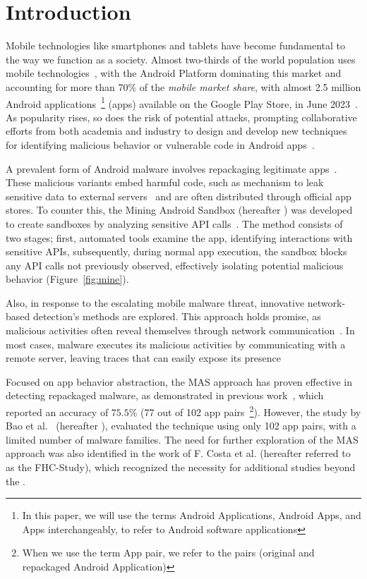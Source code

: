 \section{Introduction}\label{sec:introduction}

Mobile technologies like smartphones and tablets have become fundamental to the way we function as a society. Almost two-thirds of the world population uses mobile technologies~\cite{Comscore,DBLP:journals/tse/MartinSJZH17}, with the
Android Platform dominating this market and accounting for more than 70\% of the \emph{mobile market share}, with almost 2.5 million Android applications~\footnote{In this paper, we will use the terms Android Applications, Android Apps, and Apps interchangeably, to refer to Android software applications} (apps) available on the Google Play Store, in June 2023~\cite{Statista}.  
As popularity rises, so does the risk of potential attacks, prompting collaborative efforts from both academia and industry to design and develop new techniques for identifying malicious behavior or vulnerable code in Android apps~\cite{10.1145/3017427}.

A prevalent form of Android malware involves repackaging legitimate apps~\cite{DBLP:conf/wcre/BaoLL18, le2018towards}. These malicious variants embed harmful code, such as mechanism to leak sensitive data to external servers~\cite{DBLP:journals/tse/LiBK21} and are often distributed through official app stores. To counter this, the Mining Android Sandbox (hereafter \mas) was developed to create sandboxes by analyzing sensitive API calls~\cite{DBLP:conf/icse/JamrozikSZ16}. The method consists of two stages; first, automated tools examine the app, identifying interactions with sensitive APIs, subsequently, during normal app execution, the sandbox blocks any API calls not previously observed, effectively isolating potential malicious behavior (Figure~\ref{fig:mine}).

Also, in response to the escalating mobile malware threat, innovative network-based detection's methods are explored. This approach holds promise, as malicious activities often reveal themselves through network communication~\cite{DBLP:conf/sp/ZhouJ12}. In most cases, malware executes its malicious activities by communicating with a remote server, leaving traces that can easily expose its presence~\cite{DBLP:journals/jnca/YangHHM18}


Focused on app behavior abstraction, the MAS approach has proven effective in detecting repackaged malware, as demonstrated in previous work~\cite{DBLP:conf/wcre/BaoLL18},  which reported an accuracy of $75.5\%$ (77 out of 102 app pairs~\footnote{When we use the term App pair, we refer to the pairs (original and repackaged Android Application)}). However, the study by Bao et al.~\cite{DBLP:conf/wcre/BaoLL18} (hereafter \blls), evaluated the technique using only 102 app pairs, with a limited number of malware families. The need for further exploration of the MAS approach was also identified in the work of F. Costa et al. (hereafter referred to as the FHC-Study), which recognized the necessity for additional studies beyond the \blls. 

